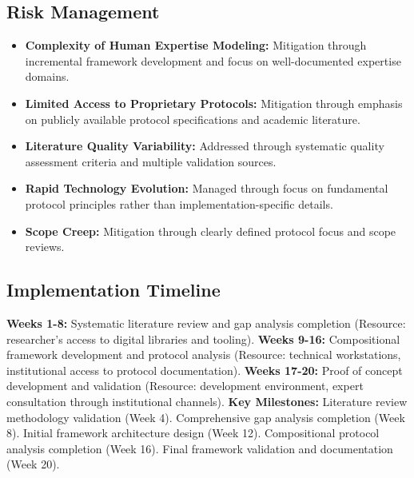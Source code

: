 \documentclass[12pt,a4paper]{article}
\begin{document}
\subsection{Risk Management}
\begin{itemize}
\item \textbf{Complexity of Human Expertise Modeling:} Mitigation through incremental framework development and focus on well-documented expertise domains.
\item \textbf{Limited Access to Proprietary Protocols:} Mitigation through emphasis on publicly available protocol specifications and academic literature.
\item \textbf{Literature Quality Variability:} Addressed through systematic quality assessment criteria and multiple validation sources.
\item \textbf{Rapid Technology Evolution:} Managed through focus on fundamental protocol principles rather than implementation-specific details.
\item \textbf{Scope Creep:} Mitigation through clearly defined protocol focus and scope reviews.
\end{itemize}

\subsection{Implementation Timeline}

\textbf{Weeks 1-8:} Systematic literature review and gap analysis completion (Resource: researcher's access to digital libraries and tooling).
\textbf{Weeks 9-16:} Compositional framework development and protocol analysis (Resource: technical workstations, institutional access to protocol documentation).
\textbf{Weeks 17-20:} Proof of concept development and validation (Resource: development environment, expert consultation through institutional channels).
\textbf{Key Milestones:} Literature review methodology validation (Week 4). Comprehensive gap analysis completion (Week 8). Initial framework architecture design (Week 12). Compositional protocol analysis completion (Week 16). Final framework validation and documentation (Week 20).
\end{document}
